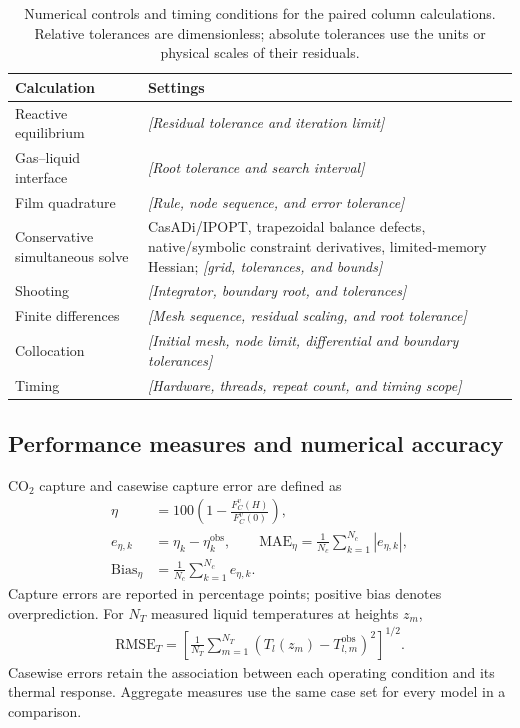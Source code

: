 \begin{table}[pos=htbp]
\centering\small
\caption{Numerical controls and timing conditions for the paired column calculations. Relative tolerances are dimensionless; absolute tolerances use the units or physical scales of their residuals.}
\label{tab:numerical-settings}
\begin{tabularx}{\linewidth}{@{}lX@{}}
\toprule
Calculation & Settings\\
\midrule
Reactive equilibrium & \textit{[Residual tolerance and iteration limit]}\\
Gas--liquid interface & \textit{[Root tolerance and search interval]}\\
Film quadrature & \textit{[Rule, node sequence, and error tolerance]}\\
Conservative simultaneous solve & CasADi/IPOPT, trapezoidal balance defects, native/symbolic constraint derivatives, limited-memory Hessian; \textit{[grid, tolerances, and bounds]}\\
Shooting & \textit{[Integrator, boundary root, and tolerances]}\\
Finite differences & \textit{[Mesh sequence, residual scaling, and root tolerance]}\\
Collocation & \textit{[Initial mesh, node limit, differential and boundary tolerances]}\\
Timing & \textit{[Hardware, threads, repeat count, and timing scope]}\\
\bottomrule
\end{tabularx}
\end{table}

\subsection{Performance measures and numerical accuracy}
CO$_2$ capture and casewise capture error are defined as
\begin{align}
\eta&=100\left(1-\frac{F_C^v(H)}{F_C^v(0)}\right),\\
e_{\eta,k}&=\eta_k-\eta_k^{\mathrm{obs}},\qquad
\mathrm{MAE}_{\eta}=\frac{1}{N_c}\sum_{k=1}^{N_c}|e_{\eta,k}|,\\
\mathrm{Bias}_{\eta}&=\frac{1}{N_c}\sum_{k=1}^{N_c}e_{\eta,k}.
\end{align}
Capture errors are reported in percentage points; positive bias denotes overprediction.
For $N_T$ measured liquid temperatures at heights $z_m$,
\begin{align}
\mathrm{RMSE}_T=\left[\frac{1}{N_T}\sum_{m=1}^{N_T}
\left(T_l(z_m)-T_{l,m}^{\mathrm{obs}}\right)^2\right]^{1/2}.
\end{align}
Casewise errors retain the association between each operating condition and its thermal response.
Aggregate measures use the same case set for every model in a comparison.

